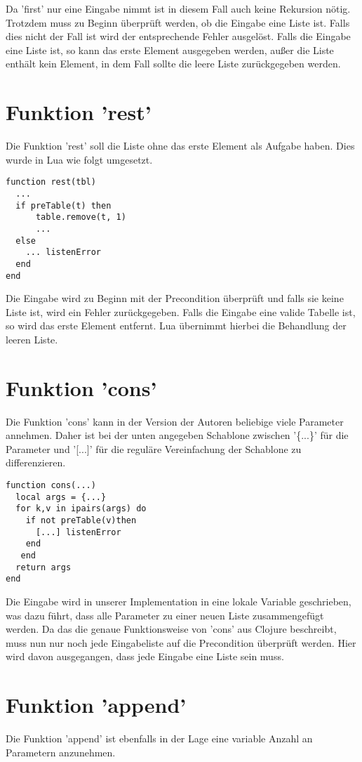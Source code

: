 Da 'first' nur eine Eingabe nimmt ist in diesem Fall auch keine Rekursion nötig. Trotzdem muss zu Beginn überprüft werden, ob die Eingabe eine Liste ist. Falls dies nicht der Fall ist wird der entsprechende Fehler ausgelöst. Falls die Eingabe eine Liste ist, so kann das erste Element ausgegeben werden, außer die Liste enthält kein Element, in dem Fall sollte die leere Liste zurückgegeben werden.

\section{Funktion 'rest'}
Die Funktion 'rest' soll die Liste ohne das erste Element als Aufgabe haben. Dies wurde in Lua wie folgt umgesetzt.

\begin{lstlisting}
function rest(tbl)
  ...
  if preTable(t) then
      table.remove(t, 1)
      ...
  else
    ... listenError
  end
end
\end{lstlisting}

Die Eingabe wird zu Beginn mit der Precondition überprüft und falls sie keine Liste ist, wird ein Fehler zurückgegeben. Falls die Eingabe eine valide Tabelle ist, so wird das erste Element entfernt. Lua übernimmt hierbei die Behandlung der leeren Liste.


\section{Funktion 'cons'}
Die Funktion 'cons' kann in der Version der Autoren beliebige viele Parameter annehmen. Daher ist bei der unten angegeben Schablone zwischen '\{...\}' für die Parameter und '[...]' für die reguläre Vereinfachung der Schablone zu differenzieren.

\begin{lstlisting}
function cons(...)
  local args = {...}
  for k,v in ipairs(args) do
    if not preTable(v)then
      [...] listenError
    end
   end
  return args
end
\end{lstlisting}

Die Eingabe wird in unserer Implementation in eine lokale Variable geschrieben, was dazu führt, dass alle Parameter zu einer neuen Liste zusammengefügt werden. Da das die genaue Funktionsweise von 'cons' aus Clojure beschreibt, muss nun nur noch jede Eingabeliste auf die Precondition überprüft werden. Hier wird davon ausgegangen, dass jede Eingabe eine Liste sein muss.

\section{Funktion 'append'}
Die Funktion 'append' ist ebenfalls in der Lage eine variable Anzahl an Parametern anzunehmen.


